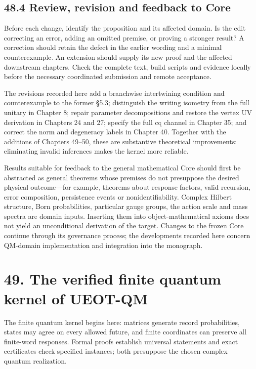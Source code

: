 \documentclass[
  11pt,
  oneside]{book}
\begin{document}
\section{48.4 Review, revision and feedback to Core}

Before each change, identify the proposition and its affected domain. Is
the edit correcting an error, adding an omitted premise, or proving a
stronger result? A correction should retain the defect in the earlier
wording and a minimal counterexample. An extension should supply its new
proof and the affected downstream chapters. Check the complete text,
build scripts and evidence locally before the necessary coordinated
submission and remote acceptance.

The revisions recorded here add a branchwise intertwining condition and
counterexample to the former §5.3; distinguish the writing isometry from
the full unitary in Chapter 8; repair parameter decompositions and
restore the vertex UV derivation in Chapters 24 and 27; specify the full
cq channel in Chapter 35; and correct the norm and degeneracy labels in
Chapter 40. Together with the additions of Chapters 49--50, these are
substantive theoretical improvements: eliminating invalid inferences
makes the kernel more reliable.

Results suitable for feedback to the general mathematical Core should
first be abstracted as general theorems whose premises do not presuppose
the desired physical outcome---for example, theorems about response
factors, valid recursion, error composition, persistence events or
nonidentifiability. Complex Hilbert structure, Born probabilities,
particular gauge groups, the action scale and mass spectra are domain
inputs. Inserting them into object-mathematical axioms does not yield an
unconditional derivation of the target. Changes to the frozen Core
continue through its governance process; the developments recorded here
concern QM-domain implementation and integration into the monograph.

\chapter{49. The verified finite quantum kernel of UEOT-QM}\label{ch-49}

The finite quantum kernel begins here: matrices generate record
probabilities, states may agree on every allowed future, and finite
coordinates can preserve all finite-word responses. Formal proofs
establish universal statements and exact certificates check specified
instances; both presuppose the chosen complex quantum realization.
\end{document}
